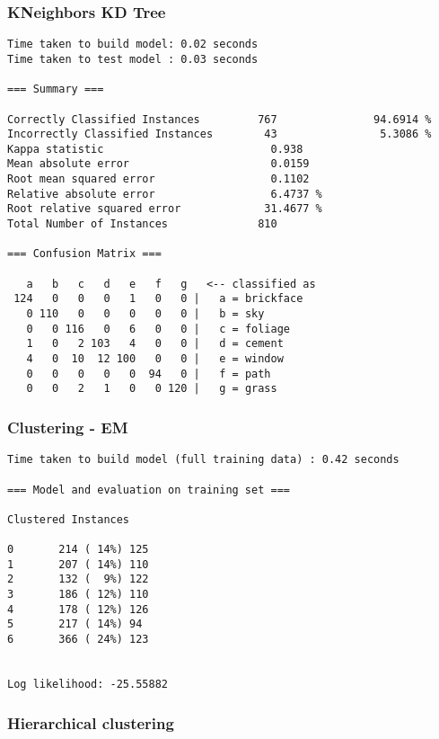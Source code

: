 \documentclass[a4paper]{article}
\begin{document}
\subsubsection{KNeighbors KD Tree}

\begin{verbatim}
Time taken to build model: 0.02 seconds
Time taken to test model : 0.03 seconds

=== Summary ===

Correctly Classified Instances         767               94.6914 %
Incorrectly Classified Instances        43                5.3086 %
Kappa statistic                          0.938
Mean absolute error                      0.0159
Root mean squared error                  0.1102
Relative absolute error                  6.4737 %
Root relative squared error             31.4677 %
Total Number of Instances              810

=== Confusion Matrix ===

   a   b   c   d   e   f   g   <-- classified as
 124   0   0   0   1   0   0 |   a = brickface
   0 110   0   0   0   0   0 |   b = sky
   0   0 116   0   6   0   0 |   c = foliage
   1   0   2 103   4   0   0 |   d = cement
   4   0  10  12 100   0   0 |   e = window
   0   0   0   0   0  94   0 |   f = path
   0   0   2   1   0   0 120 |   g = grass

\end{verbatim}

\subsubsection{Clustering - EM}

\begin{verbatim}
Time taken to build model (full training data) : 0.42 seconds

=== Model and evaluation on training set ===

Clustered Instances

0       214 ( 14%) 125
1       207 ( 14%) 110
2       132 (  9%) 122
3       186 ( 12%) 110
4       178 ( 12%) 126
5       217 ( 14%) 94
6       366 ( 24%) 123


Log likelihood: -25.55882

\end{verbatim}


\subsubsection{Hierarchical clustering}
\end{document}

